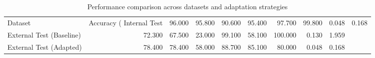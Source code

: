 \begin{table}
\caption{Performance comparison across datasets and adaptation strategies}
\label{tab:performance}
\begin{tabular}{lrrrrrrrr}
\toprule
Dataset & Accuracy (%
\midrule
Internal Test & 96.000 & 95.800 & 90.600 & 95.400 & 97.700 & 99.800 & 0.048 & 0.168 \\
External Test (Baseline) & 72.300 & 67.500 & 23.000 & 99.100 & 58.100 & 100.000 & 0.130 & 1.959 \\
External Test (Adapted) & 78.400 & 78.400 & 58.000 & 88.700 & 85.100 & 80.000 & 0.048 & 0.168 \\
\bottomrule
\end{tabular}
\end{table}
